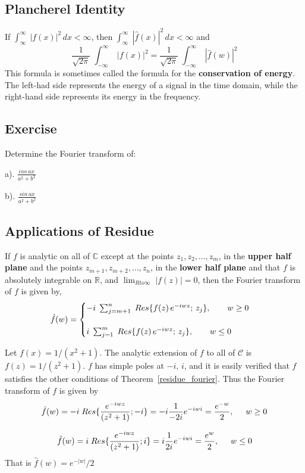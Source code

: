 \documentclass[aima331_lecturenotes_ku.tex]{subfiles}
\begin{document}
 \subsection{Plancherel Identity}
 If $\displaystyle \int_{\infty}^{\infty} \; |f(x)|^2\, dx < \infty$, then $\displaystyle \int_{\infty}^{\infty} \; |\hat{f}(x)|^2\, dx < \infty$ and
 $$\frac{1}{\sqrt{2\pi}} \; \int_{-\infty}^{\infty} \; |f(x)|^2 = \frac{1}{\sqrt{2\pi}} \; \int_{-\infty}^{\infty} \; |\hat{f}(w)|^2$$
 This formula is sometimes called the formula for the \textbf{conservation of energy}. The left-had side represents the energy of a signal in the time domain, while the right-hand side represents its energy in the frequency.
 \subsection{Exercise}
 Determine the Fourier transform of:
 \begin{multicols}{2}
   a). $\displaystyle \frac{cos\,ax}{a^2+b^2}$
   \columnbreak

   b). $\displaystyle \frac{sin\,ax}{a^2+b^2}$
 \end{multicols}

 \subsection{Applications of Residue}
 \begin{theorem}
   If $f$ is analytic on all of $\mathbb{C}$ except at the points $z_1, z_2, ..., z_m$, in the \textbf{upper half plane} and the points $z_{m+1}, z_{m+2}, ..., z_n$, in the \textbf{lower half plane} and that $f$ is absolutely integrable on $\mathbb{R}$, and $\displaystyle \lim_{R
     to \infty} \; |f(z)|=0$, then the Fourier transform of $f$ is given by,
   \begin{equation}
     \label{residue_fourier}
     \hat{f}(w)=
     \begin{cases}
       -i \; \sum_{j=m+1}^n\; Res\{f(z)\, e^{-iwz};\,z_j\}, \hspace{7mm} w \geq 0 \\[5mm]
       i \; \sum_{j=1}^m\; Res\{f(z)\, e^{-iwz};\,z_j\}, \hspace{7mm} w \leq 0
     \end{cases}
   \end{equation}
 \end{theorem}
 \begin{example}
   Let $f(x)= 1 / (x^2 +1)$. The analytic extension of $f$ to all of $\mathcal{C}$ is $f(z) = 1 / (z^2 +1)$. $f$ has simple poles at $-i,\, i$, and it is easily verified that $f$ satisfies the other conditions of Theorem~\ref{residue_fourier}. Thus the Fourier transform of $f$ is given by
   $$\hat{f}(w) = -i \; Res\{\frac{e^{-iwz}}{(z^2 +1)} ; -i\}= -i \frac{1}{-2i}e^{-iwi} = \frac{e^{-w}}{2}, \hspace{5mm} w\geq 0$$

   $$\hat{f}(w) = i \; Res\{\frac{e^{-iwz}}{(z^2 +1)} ; i\}= i \frac{1}{2i}e^{-iwi} = \frac{e^{w}}{2}, \hspace{5mm} w\leq 0$$
   That is $\hat{f}(w) = e^{-|w|} /2$
 \end{example}
\end{document}
